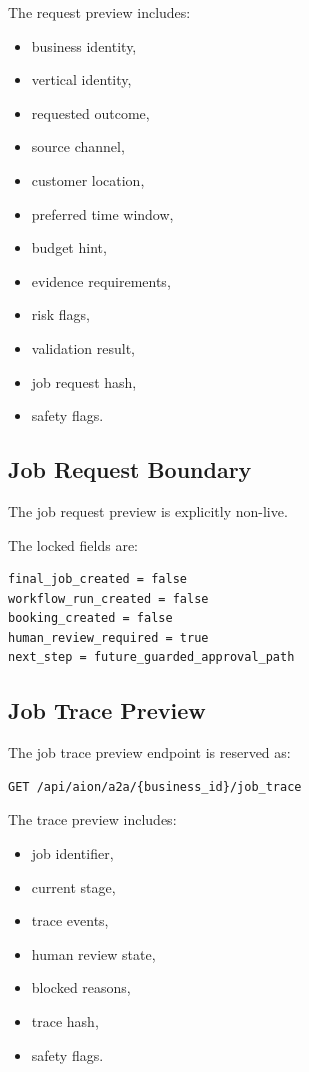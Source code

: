 The request preview includes:

\begin{itemize}
  \item business identity,
  \item vertical identity,
  \item requested outcome,
  \item source channel,
  \item customer location,
  \item preferred time window,
  \item budget hint,
  \item evidence requirements,
  \item risk flags,
  \item validation result,
  \item job request hash,
  \item safety flags.
\end{itemize}

\subsection{Job Request Boundary}

The job request preview is explicitly non-live.

The locked fields are:

\begin{verbatim}
final_job_created = false
workflow_run_created = false
booking_created = false
human_review_required = true
next_step = future_guarded_approval_path
\end{verbatim}

\subsection{Job Trace Preview}

The job trace preview endpoint is reserved as:

\begin{verbatim}
GET /api/aion/a2a/{business_id}/job_trace
\end{verbatim}

The trace preview includes:

\begin{itemize}
  \item job identifier,
  \item current stage,
  \item trace events,
  \item human review state,
  \item blocked reasons,
  \item trace hash,
  \item safety flags.
\end{itemize}

